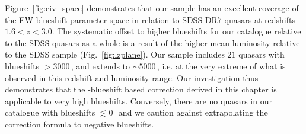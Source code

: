 Figure~\ref{fig:civ_space} demonstrates that our sample has an excellent coverage of the EW-blueshift parameter space in relation to SDSS DR$7$ quasars at redshifts $1.6 < z < 3.0$. 
The systematic offset to higher  blueshifts for our catalogue relative to the SDSS quasars as a whole is a result of the higher mean luminosity relative to the SDSS sample (Fig.~\ref{fig:lzplane}).
Our sample includes $21$ quasars with  blueshifts $>3000$\,\kms, and extends to $\sim5000$\,\kms, i.e. at the very extreme of what is observed in this redshift and luminosity range. 
Our investigation thus demonstrates that the -blueshift based correction derived in this chapter is applicable to very high blueshifts. 
Conversely, there are no quasars in our catalogue with  blueshifts $\lesssim0$\,\kms\, and we caution against extrapolating the correction formula to negative blueshifts. 

